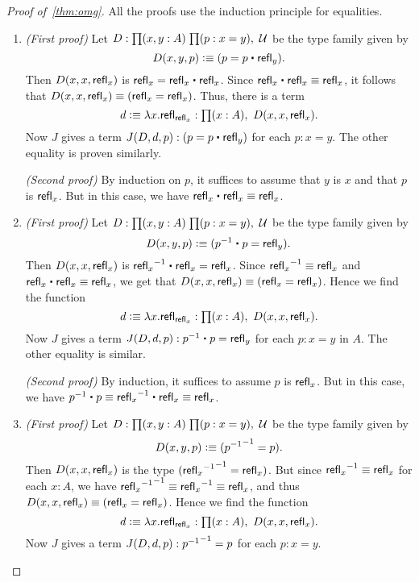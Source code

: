 \begin{proof}[Proof of~\autoref{thm:omg}]
  All the proofs use the induction principle for equalities.
  \begin{enumerate}
  \item \emph{(First proof)} Let $D:\prd{x,y:A}{p:x=y} \type$ be the type family given by 
    \begin{equation*}
      D(x,y,p)\defeq (p= p\ct \refl{y}).
    \end{equation*}
    Then $D(x,x,\mathsf{refl}_{x})$ is $\refl{x}=\refl{x}\ct\refl{x}$.
    Since $\refl{x}\ct\refl{x}\jdeq\refl{x}$, it follows that $D(x,x,\mathsf{refl}_{x})\equiv (\mathsf{refl}_{x}=\mathsf{refl}_{x})$.
    Thus, there is a term
    \begin{equation*}
      d\defeq\lambda x.\refl{\refl{x}}:\prd{x:A} D(x,x,\refl{x}).
    \end{equation*}
    Now $J$ gives a term $J(D,d,p):(p= p\ct\refl{y})$ for each $p:x= y$.
    The other equality is proven similarly.

    \noindent
    \emph{(Second proof)} By induction on $p$, it suffices to assume that $y$ is $x$ and that $p$ is $\mathsf{refl}_{x}$.
    But in this case, we have $\refl{x}\ct\refl{x}\jdeq\refl{x}$.
  \item \emph{(First proof)} Let $D:\prd{x,y:A}{p:x=y} \type$ be the type family given by 
    \begin{equation*}
      D(x,y,p)\defeq (\opp{p}\ct p=  \refl{y}).
    \end{equation*}
    Then $D(x,x,\mathsf{refl}_{x})$ is $\opp{\refl{x}}\ct\refl{x}=\refl{x}$.
    Since $\mathord{{\mathsf{refl}_{x}}^{-1}}\equiv\mathsf{refl}_{x}$ and $\refl{x}\ct\refl{x}\jdeq\refl{x}$, we get that $D(x,x,\mathsf{refl}_{x})\equiv (\mathsf{refl}_{x}=\mathsf{refl}_{x})$.
    Hence we find the function
    \begin{equation*}
      d\defeq\lambda x.\refl{\refl{x}}:\prd{x:A} D(x,x,\refl{x}).
    \end{equation*}
    Now $J$ gives a term $J(D,d,p):\opp{p}\ct p=\refl{y}$ for each $p:x= y$ in $A$.
    The other equality is similar.

    \noindent \emph{(Second proof)} By induction, it suffices to assume $p$ is $\mathsf{refl}_{x}$.
    But in this case, we have $\opp{p} \ct p \jdeq \opp{\refl x} \ct \refl x \jdeq \refl x$.
  \item \emph{(First proof)} Let $D:\prd{x,y:A}{p:x=y} \type$ be the type family given by
    \begin{equation*}
      D(x,y,p)\vcentcolon\equiv (\mathord{{\mathord{{p}^{-1}}}^{-1}}= p).
    \end{equation*}
    Then $D(x,x,\mathsf{refl}_{x})$ is the type $(\mathord{{\mathord{{\mathsf{refl}_{x}}^{-1}}}^{-1}}=\mathsf{refl}_{x})$.
    But since $\mathord{{\mathsf{refl}_{x}}^{-1}}\equiv \mathsf{refl}_{x}$ for each $x:A$, we have $\mathord{{\mathord{{\mathsf{refl}_{x}}^{-1}}}^{-1}}\equiv \mathord{{\mathsf{refl}_{x}}^{-1}} \equiv\mathsf{refl}_{x}$, and thus $D(x,x,\mathsf{refl}_{x})\equiv(\mathsf{refl}_{x}=\mathsf{refl}_{x})$.
    Hence we find the function
    \begin{equation*}
      d\defeq\lambda x.\refl{\refl{x}}:\prd{x:A} D(x,x,\refl{x}).
    \end{equation*}
    Now $J$ gives a term $J(D,d,p):\mathord{{\mathord{{p}^{-1}}}^{-1}}= p$ for each $p:x= y$.


\end{enumerate}
\end{proof}
